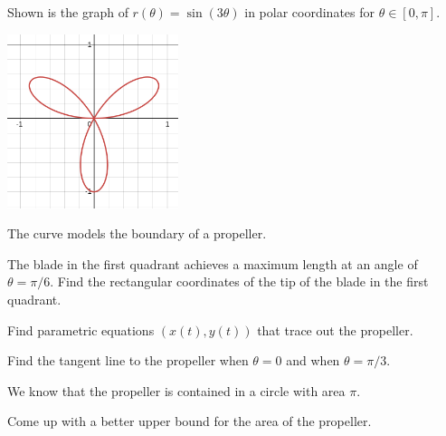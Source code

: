 \documentclass{workbook}
\begin{document}
\begin{slide}
	\question

		Shown is the graph of $\displaystyle
		r(\theta)=\sin(3\theta)
		$
		in polar coordinates
		for $\theta\in[0,\pi]$.
		\begin{center}
	\includegraphics[height=2in]{images/parametric2.png}
		\end{center}

	
	The curve models the boundary of a propeller.

	\begin{parts}
		\item The blade in the first quadrant achieves a maximum length at 
		an angle of $\theta =\pi/6$. Find the rectangular coordinates of
		the tip of the blade in the first quadrant.

		\item Find parametric equations $(x(t), y(t))$ that trace out the 
		propeller.

		\item Find the tangent line to the propeller when $\theta=0$
		and when $\theta =\pi/3$.

		\item We know that the propeller is contained in 
		a circle with area $\pi$.

		Come up with a better upper bound for the area of the 
		propeller.		
	\end{parts}
\end{slide}
\end{document}

